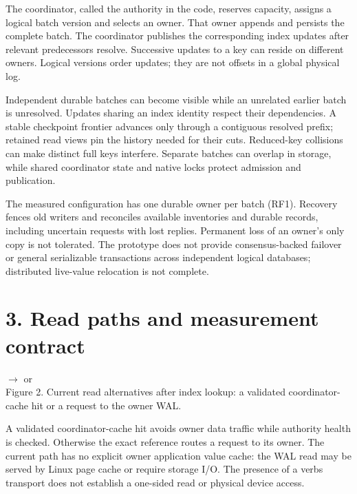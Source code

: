 \documentclass[10pt,a4paper]{article}
\begin{document}
The coordinator, called the authority in the code, reserves capacity, assigns a logical batch version and selects an owner. That owner appends and persists the complete batch. The coordinator publishes the corresponding index updates after relevant predecessors resolve. Successive updates to a key can reside on different owners. Logical versions order updates; they are not offsets in a global physical log.

Independent durable batches can become visible while an unrelated earlier batch is unresolved. Updates sharing an index identity respect their dependencies. A stable checkpoint frontier advances only through a contiguous resolved prefix; retained read views pin the history needed for their cuts. Reduced-key collisions can make distinct full keys interfere. Separate batches can overlap in storage, while shared coordinator state and native locks protect admission and publication.

The measured configuration has one durable owner per batch (RF1). Recovery fences old writers and reconciles available inventories and durable records, including uncertain requests with lost replies. Permanent loss of an owner's only copy is not tolerated. The prototype does not provide consensus-backed failover or general serializable transactions across independent logical databases; distributed live-value relocation is not complete.

\section*{3. Read paths and measurement contract}
\begin{center}
\small
{}
$\longrightarrow$
\quad or \quad
{}\\[4pt]
\small Figure 2. Current read alternatives after index lookup: a validated coordinator-cache hit or a request to the owner WAL.
\end{center}

A validated coordinator-cache hit avoids owner data traffic while authority health is checked. Otherwise the exact reference routes a request to its owner. The current path has no explicit owner application value cache: the WAL read may be served by Linux page cache or require storage I/O. The presence of a verbs transport does not establish a one-sided read or physical device access.
\end{document}
